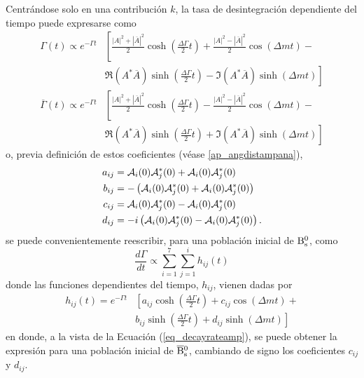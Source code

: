 Centrándose solo en una contribución $k$, la tasa de desintegración dependiente del tiempo puede expresarse como
\begin{equation}
\begin{split}
\Gamma (t)  \propto e^{-\Gamma t} &\left[\frac{|A|^2+|\overline{A}|^2}{2} \cosh \left(\frac{\Delta \Gamma}{2} t \right) + \frac{|A|^2-|\overline{A}|^2}{2} \cos \left(\Delta m t \right) \right. - \\ & \left. \Re (A^* \overline{A}) \sinh \left(\frac{\Delta \Gamma}{2} t \right) - \Im (A^* \overline{A}) \sinh \left(\Delta m t\right) \right] \\
\overline{\Gamma} (t)  \propto e^{-\Gamma t} &\left[\frac{|A|^2+|\overline{A}|^2}{2} \cosh \left(\frac{\Delta \Gamma}{2} t \right) - \frac{|A|^2-|\overline{A}|^2}{2} \cos \left(\Delta m t \right) \right. - \\ & \left. \Re (A^* \overline{A}) \sinh \left(\frac{\Delta \Gamma}{2} t \right) + \Im (A^* \overline{A}) \sinh \left(\Delta m t\right) \right] 
\end{split}	 \label{eq_decayrateamp}
\end{equation}
o, previa definición de estos coeficientes (véase \ref{ap_angdistampana}),
\begin{equation}
\begin{split}
a_{ij} &= \mathcal{A}_i(0) \mathcal{A}_j^*(0) + \mathcal{A}_i (0) \mathcal{A}_j^* (0)\\
b_{ij} &= -\left(\mathcal{A}_i(0) \mathcal{A}_j^*(0) + \mathcal{A}_i (0) \mathcal{A}_j^* (0) \right)\\
c_{ij} &= \mathcal{A}_i(0) \mathcal{A}_j^*(0) - \mathcal{A}_i (0) \mathcal{A}_j^* (0)\\
d_{ij} &= -i \left(\mathcal{A}_i(0) \mathcal{A}_j^*(0) - \mathcal{A}_i (0) \mathcal{A}_j^* (0) \right).
\end{split}
\end{equation}
se puede convenientemente reescribir, para una población inicial de $\mathrm{B}{}_{\mathrm{s}}^{0}$, como
\begin{equation}
	\frac{d\Gamma}{dt} \propto \sum_{i=1}^{7}\sum_{j=1}^i h_{ij}(t)
\end{equation}
donde las funciones dependientes del tiempo, $h_{ij}$, vienen dadas por 
\begin{equation}
\begin{split}
	h_{ij}(t) = e^{-\Gamma t} &\left[  a_{ij} \cosh \left(\frac{\Delta \Gamma}{2} t \right) + c_{ij} \cos \left(\Delta m t \right) \right. + \\ & \left. b_{ij} \sinh \left(\frac{\Delta \Gamma}{2} t \right) + d_{ij} \sinh \left(\Delta m t\right) \right]
\end{split}
\end{equation}
en donde, a la vista de la Ecuación (\ref{eq_decayrateamp}), se puede obtener la expresión para una población inicial de $\overline{\mathrm{B}}{}_{\mathrm{s}}^{0}$, cambiando de signo los coeficientes $c_{ij}$ y $d_{ij}$.



